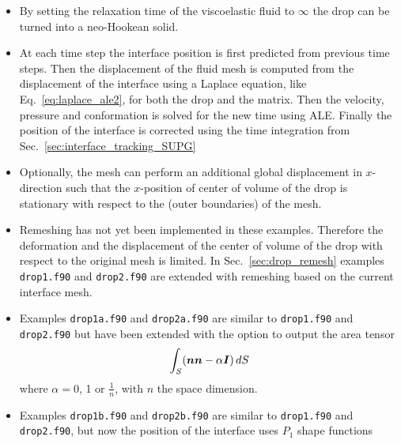 \begin{itemize}
\begin{align*}
   V&=\int_V1\,dx=\frac1d\int_V\nabla\cdot\vek x\,dx=
          \frac1d\int_S\vek n\cdot\vek x\,ds \\
   \vek Q&=\int_V\vek x\,dx=\frac12\int_V\nabla|\vek x|^2\,dx=
          \frac12\int_S\vek n|\vek x|^2\,ds
\end{align*}
     where $d$ is the dimension of space, $\vek Q$ is the first (linear)
     moment of area/volume, and $\vek n$ 
     is the outwardly directed unit normal on the interface $S$. The center
     of volume of the drop can be computed from $\vek x_\text{c}=\vek Q/V$.
   \item By setting the relaxation time of the viscoelastic fluid to $\infty$ 
         the drop can be turned into a neo-Hookean solid.
   \item At each time step the interface position is first predicted from
         previous time steps. Then the displacement of the fluid mesh is
         computed from the displacement of the interface using
         a Laplace equation, like Eq.~\eqref{eq:laplace_ale2}, for both the drop
         and the matrix. Then the velocity, pressure and conformation is solved
         for the new time using ALE. Finally the position of the interface is
         corrected using the time integration from
         Sec.~\ref{sec:interface_tracking_SUPG}
   \item Optionally, the mesh can perform an additional global displacement 
         in $x$-direction such that the $x$-position of center of volume of the
         drop is stationary with respect to the (outer boundaries) of the mesh.
   \item Remeshing has not yet been implemented in these examples. Therefore the deformation and
         the displacement of the center of volume of the drop with respect to
         the original mesh is limited. In Sec.~\ref{sec:drop_remesh} examples \texttt{drop1.f90} and
         \texttt{drop2.f90} are extended with remeshing based on the current interface mesh.
    \item Examples \texttt{drop1a.f90} and \texttt{drop2a.f90} are similar to
          \texttt{drop1.f90} and \texttt{drop2.f90} but have been extended
          with the option to output the area tensor
\begin{equation}
  \int_S(\boldsymbol{n}\boldsymbol{n}-\alpha\boldsymbol{I})\,dS
\end{equation}
where $\alpha=0$, 1 or $\frac1n$, with $n$ the space dimension.
    \item Examples \texttt{drop1b.f90} and \texttt{drop2b.f90} are similar to
          \texttt{drop1.f90} and \texttt{drop2.f90}, but now the position of the interface uses $P_1$ shape functions

\end{itemize}
